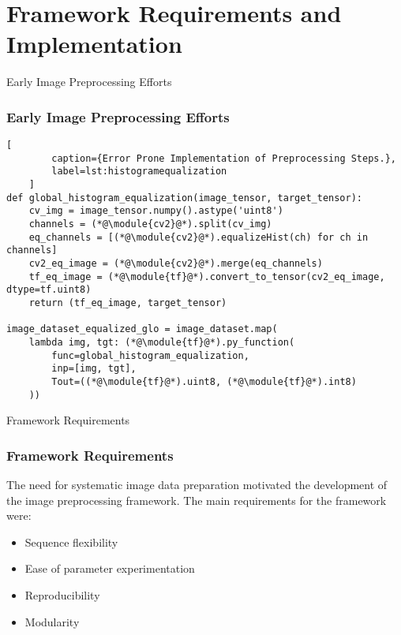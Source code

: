 \section{Framework Requirements and Implementation}
\label{framework_requirements_and_implementation_section}


\begin{frame}[fragile]{Early Image Preprocessing Efforts}
    \frametitle{Early Image Preprocessing Efforts}
    \begin{lstlisting}[
        caption={Error Prone Implementation of Preprocessing Steps.}, 
        label=lst:histogramequalization
    ]
def global_histogram_equalization(image_tensor, target_tensor):
    cv_img = image_tensor.numpy().astype('uint8')
    channels = (*@\module{cv2}@*).split(cv_img)
    eq_channels = [(*@\module{cv2}@*).equalizeHist(ch) for ch in channels]  
    cv2_eq_image = (*@\module{cv2}@*).merge(eq_channels)
    tf_eq_image = (*@\module{tf}@*).convert_to_tensor(cv2_eq_image, dtype=tf.uint8) 
    return (tf_eq_image, target_tensor)

image_dataset_equalized_glo = image_dataset.map(
    lambda img, tgt: (*@\module{tf}@*).py_function(
        func=global_histogram_equalization, 
        inp=[img, tgt], 
        Tout=((*@\module{tf}@*).uint8, (*@\module{tf}@*).int8)
    ))
    \end{lstlisting}
\end{frame}

\begin{frame}{Framework Requirements}
    \frametitle{Framework Requirements}
    The need for systematic image data preparation motivated the development of the image preprocessing framework. The main requirements for the framework were:
    \vspace{0.5em}
    \begin{itemize}
        \item Sequence flexibility %
        \item Ease of parameter experimentation %
        \item Reproducibility %
        \item Modularity %
    \end{itemize}
\end{frame}

